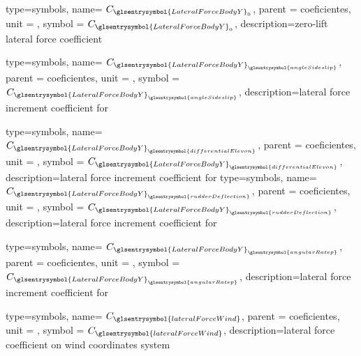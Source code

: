 {type=symbols,
    name= \ensuremath{C_{\glsentrysymbol{LateralForceBodyY}_{0}}},
    parent = {coeficientes},
    unit = \unexpanded{},
    symbol = \ensuremath{C_{\glsentrysymbol{LateralForceBodyY}_{0}}},
    description={zero-lift lateral force coefficient}
}

{type=symbols,
    name= \ensuremath{C_{{\glsentrysymbol{LateralForceBodyY}}_{\glsentrysymbol{angleSideslip}}}},
    parent = {coeficientes},
    unit = \unexpanded{},
    symbol = \ensuremath{C_{{\glsentrysymbol{LateralForceBodyY}}_{\glsentrysymbol{angleSideslip}}}},
    description={lateral force increment coefficient for }
}

{type=symbols,
    name= \ensuremath{C_{{\glsentrysymbol{LateralForceBodyY}}_{\glsentrysymbol{differentialElevon}}}},
    parent = {coeficientes},
    unit = \unexpanded{},
    symbol = \ensuremath{C_{{\glsentrysymbol{LateralForceBodyY}}_{\glsentrysymbol{differentialElevon}}}},
    description={lateral force increment coefficient for }
}
{type=symbols,
    name= \ensuremath{C_{{\glsentrysymbol{LateralForceBodyY}}_{\glsentrysymbol{rudderDeflection}}}},
    parent = {coeficientes},
    unit = \unexpanded{},
    symbol = \ensuremath{C_{{\glsentrysymbol{LateralForceBodyY}}_{\glsentrysymbol{rudderDeflection}}}},
    description={lateral force increment coefficient for }
}

{type=symbols,
    name= \ensuremath{C_{{\glsentrysymbol{LateralForceBodyY}}_{\glsentrysymbol{angularRatep}}}},
    parent = {coeficientes},
    unit = \unexpanded{},
    symbol = \ensuremath{C_{{\glsentrysymbol{LateralForceBodyY}}_{\glsentrysymbol{angularRatep}}}},
    description={lateral force increment coefficient for }
}



{type=symbols,
    name= \ensuremath{C_{\glsentrysymbol{lateralForceWind}}},
    parent = {coeficientes},
    unit = \unexpanded{},
    symbol = \ensuremath{C_{\glsentrysymbol{lateralForceWind}}},
    description={lateral force coefficient on wind coordinates system }
}

